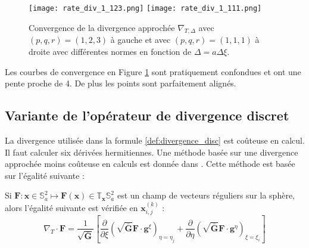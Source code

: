 \begin{figure}[htbp]
\begin{center}
\texttt{[image: rate\_div\_1\_123.png]}
\texttt{[image: rate\_div\_1\_111.png]}
\end{center}
\caption{Convergence de la divergence approchée $\nabla_{T,\Delta}$ avec $(p,q,r)=(1,2,3)$ à gauche et avec $(p,q,r)=(1,1,1)$ à droite avec différentes normes en fonction de $\Delta = a \Delta \xi$.}
\label{fig:rate_div1}
\end{figure}

Les courbes de convergence en Figure \ref{fig:rate_div1} sont pratiquement confondues et ont une pente proche de 4. De plus les points sont parfaitement alignés.


\subsection{Variante de l'opérateur de divergence discret}

La divergence utilisée dans la formule \eqref{def:divergence_disc} est coûteuse en calcul. Il faut calculer six dérivées hermitiennes. Une méthode basée sur une divergence approchée moins coûteuse en calculs est donnée dans \cite{Croisille2015}. Cette méthode est basée sur l'égalité suivante :

\begin{proposition}
Si $\mathbf{F} : \mathbf{x} \in \mathbb{S}_a^2 \mapsto \mathbf{F}(\mathbf{x}) \in \mathbb{T}_{\mathbf{x}} \mathbb{S}_a^2$ est un champ de vecteurs réguliers sur la sphère, alors l'égalité suivante est vérifiée en $\mathbf{x}_{i,j}^{(k)}$ :
\begin{equation}
\nabla_T \cdot \mathbf{F} = \dfrac{1}{\sqrt{\bar{\mathbf{G}}}} \left[ \dfrac{\partial}{\partial \xi} \left( \sqrt{\bar{\mathbf{G}}} \mathbf{F} \cdot \mathbf{g}^{\xi} \right)_{\eta = \eta_j} + 
\dfrac{\partial}{\partial \eta} \left( \sqrt{\bar{\mathbf{G}}} \mathbf{F} \cdot \mathbf{g}^{\eta} \right)_{\xi = \xi_i}
\right]
\label{eq:divergence_v2}
\end{equation}
\end{proposition}

